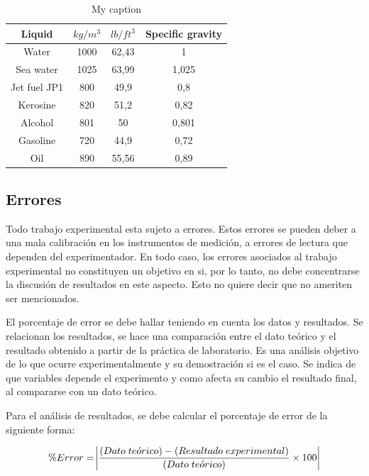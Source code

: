 \documentclass[a4paper]{article}
\begin{document}
\begin{table}[H]
\centering
\caption{My caption}
\label{my-label}
\begin{tabular}{|c|c|c|c|}
\hline
Liquid       & $kg/m^{3}$ & $lb/ft^{3}$ & Specific gravity \\ \hline
Water        & 1000 & 62,43 & 1                \\ \hline
Sea water    & 1025 & 63,99 & 1,025            \\ \hline
Jet fuel JP1 & 800  & 49,9  & 0,8              \\ \hline
Kerosine     & 820  & 51,2  & 0,82             \\ \hline
Alcohol      & 801  & 50    & 0,801            \\ \hline
Gasoline     & 720  & 44,9  & 0,72             \\ \hline
Oil          & 890  & 55,56 & 0,89             \\ \hline
\end{tabular}
\end{table}

\subsection{Errores}
Todo trabajo experimental esta sujeto a errores. Estos errores se pueden deber a una mala calibración en los instrumentos de medición, a errores de lectura que dependen del experimentador. En todo caso, los errores asociados al trabajo experimental no constituyen un objetivo en si, por lo tanto, no debe concentrarse la discusión de resultados en este aspecto. Esto no quiere decir que no ameriten ser mencionados.

 
El porcentaje de error se debe hallar teniendo en cuenta los datos y resultados. Se relacionan los resultados, se hace una comparación entre el dato teórico y el resultado obtenido a partir de la práctica de laboratorio. Es una análisis objetivo de lo que ocurre experimentalmente y su demostración si es el caso. Se indica de que variables depende el experimento y como afecta su cambio el resultado final, al compararse con un dato teórico.

 
Para el análisis de resultados, se debe calcular el porcentaje de error de la siguiente forma:

\begin{equation}
\% Error = \abs{\frac{(Dato\; te\acute{o}rico)-(Resultado\; experimental)}{(Dato\; te\acute{o}rico)}\times 100}
\end{equation}
\end{document}
